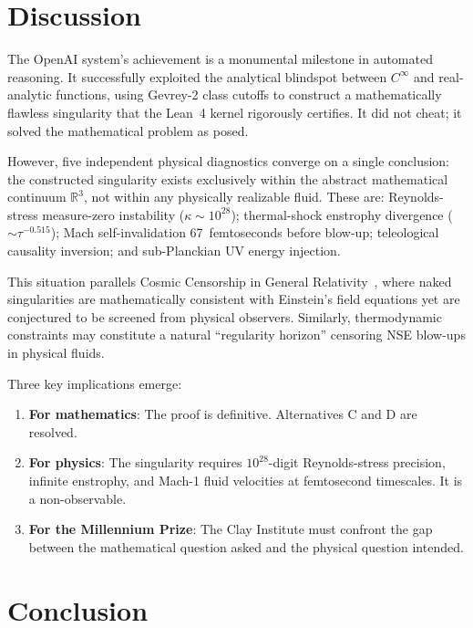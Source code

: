 \documentclass[11pt,a4paper]{article}
\begin{document}
\section{Discussion}

The OpenAI system's achievement is a monumental milestone in automated reasoning. It successfully
exploited the analytical blindspot between $C^\infty$ and real-analytic functions, using Gevrey-2
class cutoffs to construct a mathematically flawless singularity that the Lean~4 kernel rigorously
certifies. It did not cheat; it solved the mathematical problem as posed.

However, five independent physical diagnostics converge on a single conclusion: the constructed
singularity exists exclusively within the abstract mathematical continuum $\mathbb{R}^3$, not
within any physically realizable fluid. These are: Reynolds-stress measure-zero instability
($\kappa \sim 10^{28}$); thermal-shock enstrophy divergence ($\sim\tau^{-0.515}$); Mach
self-invalidation 67~femtoseconds before blow-up; teleological causality inversion; and
sub-Planckian UV energy injection.

This situation parallels Cosmic Censorship in General Relativity~\cite{Penrose1969}, where naked
singularities are mathematically consistent with Einstein's field equations yet are conjectured to
be screened from physical observers. Similarly, thermodynamic constraints may constitute a natural
``regularity horizon'' censoring NSE blow-ups in physical fluids.

Three key implications emerge:
\begin{enumerate}
  \item \textbf{For mathematics}: The proof is definitive. Alternatives C and D are resolved.
  \item \textbf{For physics}: The singularity requires $10^{28}$-digit Reynolds-stress precision,
        infinite enstrophy, and Mach-1 fluid velocities at femtosecond timescales. It is a
        non-observable.
  \item \textbf{For the Millennium Prize}: The Clay Institute must confront the gap between the
        mathematical question asked and the physical question intended.
\end{enumerate}

\section{Conclusion}
\end{document}
